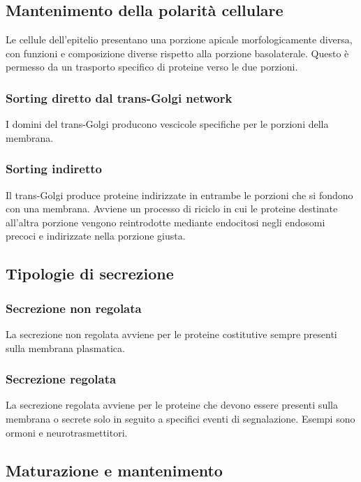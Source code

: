 	\subsection{Mantenimento della polarit\`a cellulare}
	Le cellule dell'epitelio presentano una porzione apicale morfologicamente diversa, con funzioni e composizione diverse rispetto alla porzione basolaterale.
	Questo \`e permesso da un trasporto specifico di proteine verso le due porzioni.

		\subsubsection{Sorting diretto dal trans-Golgi network}
		I domini del trans-Golgi producono vescicole specifiche per le porzioni della membrana.

		\subsubsection{Sorting indiretto}
		Il trans-Golgi produce proteine indirizzate in entrambe le porzioni che si fondono con una membrana.
		Avviene un processo di riciclo in cui le proteine destinate all'altra porzione vengono reintrodotte mediante endocitosi negli endosomi precoci e indirizzate nella porzione giusta.


	\subsection{Tipologie di secrezione}
	
		\subsubsection{Secrezione non regolata}
		La secrezione non regolata avviene per le proteine costitutive sempre presenti sulla membrana plasmatica.

		\subsubsection{Secrezione regolata}
		La secrezione regolata avviene per le proteine che devono essere presenti sulla membrana o secrete solo in seguito a specifici eventi di segnalazione.
		Esempi sono ormoni e neurotrasmettitori.

	\subsection{Maturazione e mantenimento}

